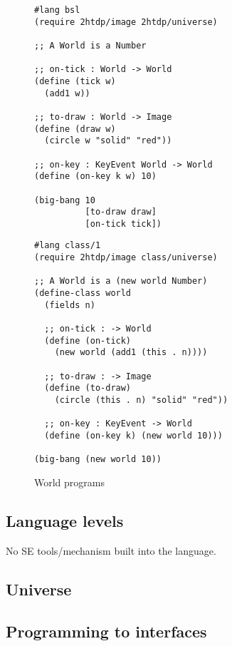 \documentclass[submission,copyright]{eptcs}
\begin{document}
\begin{figure}
\begin{minipage}[t]{3.4in}
\begin{verbatim}
#lang bsl
(require 2htdp/image 2htdp/universe)

;; A World is a Number

;; on-tick : World -> World
(define (tick w)
  (add1 w))

;; to-draw : World -> Image
(define (draw w)
  (circle w "solid" "red"))

;; on-key : KeyEvent World -> World
(define (on-key k w) 10)

(big-bang 10
          [to-draw draw]
          [on-tick tick])
\end{verbatim}
\end{minipage}
\begin{minipage}[t]{3in}
\begin{verbatim}
#lang class/1
(require 2htdp/image class/universe)

;; A World is a (new world Number)
(define-class world
  (fields n)

  ;; on-tick : -> World
  (define (on-tick)
    (new world (add1 (this . n))))

  ;; to-draw : -> Image
  (define (to-draw) 
    (circle (this . n) "solid" "red"))

  ;; on-key : KeyEvent -> World
  (define (on-key k) (new world 10)))
  
(big-bang (new world 10))
\end{verbatim}
\end{minipage}
\caption{World programs}
\label{fig:world}
\end{figure}


\subsection{Language levels}

No SE tools/mechanism built into the language.

\subsection{Universe}

\subsection{Programming to interfaces}
\end{document}
